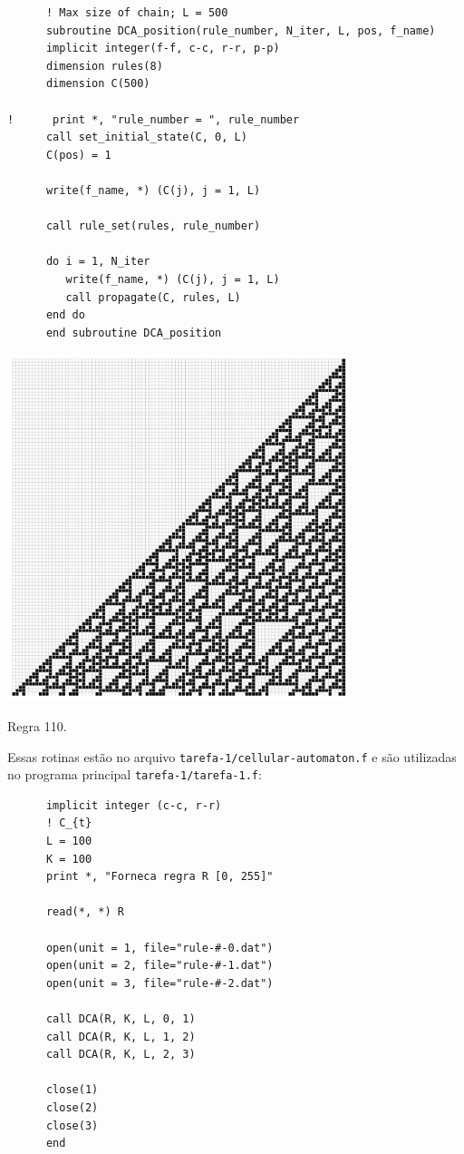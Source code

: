\documentclass[a4paper, 11pt]{tufte-handout}
\begin{document}
\begin{verbatim}
      ! Max size of chain; L = 500
      subroutine DCA_position(rule_number, N_iter, L, pos, f_name)
      implicit integer(f-f, c-c, r-r, p-p)
      dimension rules(8)
      dimension C(500)

!      print *, "rule_number = ", rule_number
      call set_initial_state(C, 0, L)
      C(pos) = 1

      write(f_name, *) (C(j), j = 1, L)

      call rule_set(rules, rule_number)

      do i = 1, N_iter
         write(f_name, *) (C(j), j = 1, L)
         call propagate(C, rules, L)
      end do
      end subroutine DCA_position
\end{verbatim}

\begin{marginfigure}
  \centering
  \includegraphics[width=0.75\textwidth]{tarefa-1/rule-110-0.png}
  \caption{Regra 110.}
  \label{fig:fig_rule110}
\end{marginfigure}



Essas rotinas estão no arquivo \verb|tarefa-1/cellular-automaton.f| e são utilizadas
no programa principal \verb|tarefa-1/tarefa-1.f|:

\begin{verbatim}
      implicit integer (c-c, r-r)
      ! C_{t}
      L = 100
      K = 100
      print *, "Forneca regra R [0, 255]"

      read(*, *) R
      
      open(unit = 1, file="rule-#-0.dat")
      open(unit = 2, file="rule-#-1.dat")
      open(unit = 3, file="rule-#-2.dat")

      call DCA(R, K, L, 0, 1)
      call DCA(R, K, L, 1, 2)
      call DCA(R, K, L, 2, 3)

      close(1)
      close(2)
      close(3)
      end
\end{verbatim}
\end{document}
